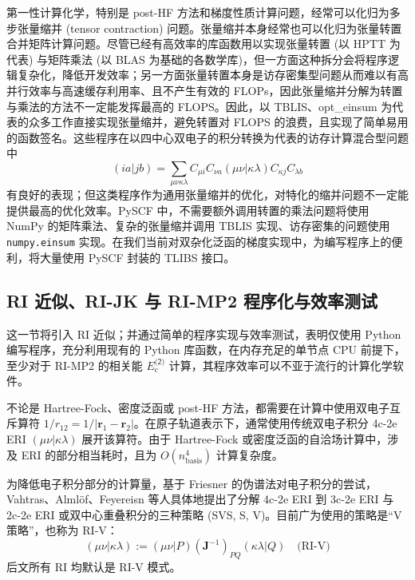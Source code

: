 第一性计算化学，特别是 post-HF 方法和梯度性质计算问题，经常可以化归为多步张量缩并 (tensor contraction) 问题。张量缩并本身经常也可以化归为张量转置合并矩阵计算问题。尽管已经有高效率的库函数用以实现张量转置 (以 HPTT 为代表) 与矩阵乘法 (以 BLAS 为基础的各数学库)，但一方面这种拆分会将程序逻辑复杂化，降低开发效率；另一方面张量转置本身是访存密集型问题从而难以有高并行效率与高速缓存利用率、且不产生有效的 FLOPs，因此张量缩并分解为转置与乘法的方法不一定能发挥最高的 FLOPS。因此，以 TBLIS、opt\_einsum 为代表的众多工作直接实现张量缩并，避免转置对 FLOPS 的浪费，且实现了简单易用的函数签名。这些程序在以四中心双电子的积分转换为代表的访存计算混合型问题中
\begin{equation*}
  (ia|jb) = \sum_{\mu \nu \kappa \lambda} C_{\mu i} C_{\nu a} (\mu \nu | \kappa \lambda) C_{\kappa j} C_{\lambda b}
\end{equation*}
有良好的表现；但这类程序作为通用张量缩并的优化，对特化的缩并问题不一定能提供最高的优化效率。PySCF 中，不需要额外调用转置的乘法问题将使用 NumPy 的矩阵乘法、复杂的张量缩并调用 TBLIS 实现、访存密集的问题使用 \verb|numpy.einsum| 实现。在我们当前对双杂化泛函的梯度实现中，为编写程序上的便利，将大量使用 PySCF 封装的 TLIBS 接口。

\subsection{RI 近似、RI-JK 与 RI-MP2 程序化与效率测试}
\label{sec.3.rijk-rimp2-efficiency}

这一节将引入 RI 近似；并通过简单的程序实现与效率测试，表明仅使用 Python 编写程序，充分利用现有的 Python 库函数，在内存充足的单节点 CPU 前提下，至少对于 RI-MP2 的相关能 $E_\mathrm{c}^\textsf{(2)}$ 计算，其程序效率可以不亚于流行的计算化学软件。

不论是 Hartree-Fock、密度泛函或 post-HF 方法，都需要在计算中使用双电子互斥算符 $1 / r_{12} = 1 / |\bm{r}_1 - \bm{r}_2|$。在原子轨道表示下，通常使用传统双电子积分 4c-2e ERI $(\mu \nu | \kappa \lambda)$ 展开该算符。由于 Hartree-Fock 或密度泛函的自洽场计算中，涉及 ERI 的部分相当耗时，且为 $O(n_\mathrm{basis}^4)$ 计算复杂度。

为降低电子积分部分的计算量，基于 Friesner 的伪谱法对电子积分的尝试\cite{Friesner-Friesner.CPL.1985, Friesner-Friesner.JCP.1987}，Vahtras、Alml\"of、Feyereisn 等人具体地提出了分解 4c-2e ERI 到 3c-2e ERI 与 2c-2e ERI 或双中心重叠积分的三种策略 (SVS, S, V)\cite{Vahtras-Feyereisen.CPL.1993}。目前广为使用的策略是“V 策略”，也称为 RI-V：
\begin{equation}
  (\mu \nu | \kappa \lambda) := (\mu \nu | P) (\mathbf{J}^{-1})_{PQ} (\kappa \lambda | Q) \quad \text{(RI-V)}
\end{equation}
后文所有 RI 均默认是 RI-V 模式。

